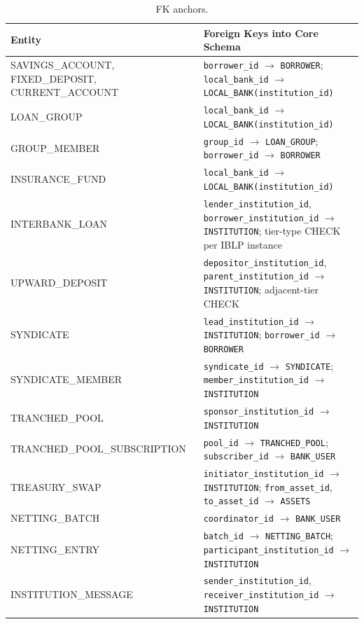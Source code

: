 \documentclass[12pt,a4paper]{report}
\newcommand{\tableheadcolor}{\rowcolor{TableHeadBg}}
\begin{document}
\begin{table}[H]
\centering
\caption[FK anchors]{FK anchors.}
\label{tab:ext-entity-fks}
\small
\begin{tabular}{@{}p{3.5cm}p{8.5cm}@{}}
\toprule
\tableheadcolor
\textbf{Entity} & \textbf{Foreign Keys into Core Schema} \\
\midrule
SAVINGS\_ACCOUNT, FIXED\_DEPOSIT, CURRENT\_ACCOUNT & \texttt{borrower\_id} $\to$ \texttt{BORROWER}; \texttt{local\_bank\_id} $\to$ \texttt{LOCAL\_BANK(institution\_id)} \\
LOAN\_GROUP & \texttt{local\_bank\_id} $\to$ \texttt{LOCAL\_BANK(institution\_id)} \\
GROUP\_MEMBER & \texttt{group\_id} $\to$ \texttt{LOAN\_GROUP}; \texttt{borrower\_id} $\to$ \texttt{BORROWER} \\
INSURANCE\_FUND & \texttt{local\_bank\_id} $\to$ \texttt{LOCAL\_BANK(institution\_id)} \\
INTERBANK\_LOAN & \texttt{lender\_institution\_id}, \texttt{borrower\_institution\_id} $\to$ \texttt{INSTITUTION}; tier-type CHECK per IBLP instance \\
UPWARD\_DEPOSIT & \texttt{depositor\_institution\_id}, \texttt{parent\_institution\_id} $\to$ \texttt{INSTITUTION}; adjacent-tier CHECK \\
SYNDICATE & \texttt{lead\_institution\_id} $\to$ \texttt{INSTITUTION}; \texttt{borrower\_id} $\to$ \texttt{BORROWER} \\
SYNDICATE\_MEMBER & \texttt{syndicate\_id} $\to$ \texttt{SYNDICATE}; \texttt{member\_institution\_id} $\to$ \texttt{INSTITUTION} \\
TRANCHED\_POOL & \texttt{sponsor\_institution\_id} $\to$ \texttt{INSTITUTION} \\
TRANCHED\_POOL\_SUBSCRIPTION & \texttt{pool\_id} $\to$ \texttt{TRANCHED\_POOL}; \texttt{subscriber\_id} $\to$ \texttt{BANK\_USER} \\
TREASURY\_SWAP & \texttt{initiator\_institution\_id} $\to$ \texttt{INSTITUTION}; \texttt{from\_asset\_id}, \texttt{to\_asset\_id} $\to$ \texttt{ASSETS} \\
NETTING\_BATCH & \texttt{coordinator\_id} $\to$ \texttt{BANK\_USER} \\
NETTING\_ENTRY & \texttt{batch\_id} $\to$ \texttt{NETTING\_BATCH}; \texttt{participant\_institution\_id} $\to$ \texttt{INSTITUTION} \\
INSTITUTION\_MESSAGE & \texttt{sender\_institution\_id}, \texttt{receiver\_institution\_id} $\to$ \texttt{INSTITUTION} \\

\end{tabular}
\end{table}
\end{document}
